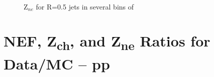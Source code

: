 \begin{figure}[h!]
    \qquad
    \\
    \caption{Z$_{ne}$ for R=0.5 jets in several bins of \pT}
    \label{fig:TriggerBiasZneR05}
\end{figure}

\newpage

\section{NEF, \texorpdfstring{Z\textsubscript{ch}}{Zch}, and \texorpdfstring{Z\textsubscript{ne}}{Zne} Ratios for Data/MC -- pp}
\label{sec:appendixTriggerBiasRatios}


